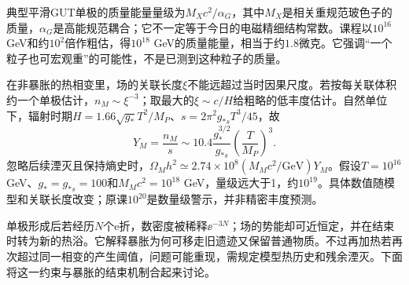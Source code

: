 典型平滑GUT单极的质量能量量级为$M_Xc^2/\alpha_G$，其中$M_X$是相关重规范玻色子的质量，$\alpha_G$是高能规范耦合；它不一定等于今日的电磁精细结构常数。课程以$10^{16}$ GeV和约$10^2$倍作粗估，得$10^{18}$ GeV的质量能量，相当于约$1.8$微克。它强调“一个粒子也可宏观重”的可能性，不是已测到这种粒子的质量。

在非暴胀的热相变里，场的关联长度$\xi$不能远超过当时因果尺度。若按每关联体积约一个单极估计，$n_M\sim\xi^{-3}$；取最大的$\xi\sim c/H$给粗略的低丰度估计。自然单位下，辐射时期$H=1.66\sqrt{g_*}T^2/M_P$、$s=2\pi^2g_{*s}T^3/45$，故
\[
 Y_M=\frac{n_M}{s}\sim10.4\frac{g_*^{3/2}}{g_{*s}}
 \left(\frac T{M_P}\right)^3.
\]
忽略后续湮灭且保持熵史时，$\Omega_Mh^2\simeq2.74\times10^8(M_Mc^2/\mathrm{GeV})Y_M$。假设$T=10^{16}$ GeV、$g_*=g_{*s}=100$和$M_Mc^2=10^{18}$ GeV，量级远大于1，约$10^{19}$。具体数值随模型和关联长度改变；原课$10^{20}$是数量级警示，并非精密丰度预测。

单极形成后若经历$N$个e折，数密度被稀释$\ee^{-3N}$；场的势能却可近恒定，并在结束时转为新的热浴。它解释暴胀为何可移走旧遗迹又保留普通物质。不过再加热若再次超过同一相变的产生阈值，问题可能重现，需规定模型热历史和残余湮灭。下面将这一约束与暴胀的结束机制合起来讨论。
